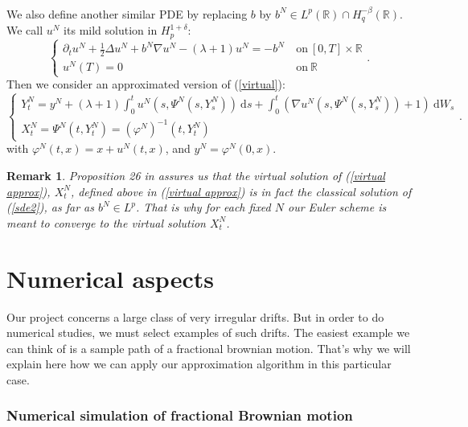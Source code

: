 \documentclass[11pt]{enstaPRE}
\newtheorem{rem}{Remark}
\newcommand{\R}{\mathbb{R}}
\newcommand{\di}{\mathrm{d}}
\begin{document}
\paragraph{}
We also define another similar PDE by replacing $b$ by $b^N\in L^p(\R)\cap H^{-\beta}_q(\R)$. We call $u^N$ its mild solution in $H_p^{1+\delta}$:
\begin{equation}\label{pde2}
\begin{cases}
\partial_t u^N + \frac{1}{2}\Delta u^N + b^N\nabla u^N - (\lambda+1)u^N = -b^N\ &\mathrm{on}\ [0,T]\times\R\\
u^N(T) = 0\ &\mathrm{on}\ \R
\end{cases}.
\end{equation}
Then we consider an approximated version of (\ref{virtual}): \begin{equation}\label{virtual approx}
\begin{cases}
Y_t^N = y^N + (\lambda+1)\int_0^t u^N\left(s,\Psi^N\left(s,Y_s^N\right)\right)\ \di s +\int_0^t \left(\nabla u^N\left(s,\Psi^N\left(s,Y_s^N\right)\right)+1\right)\ \di W_s\\
X_t^N = \Psi^N(t,Y_t^N) = {(\varphi^N)}^{-1}(t,Y_t^N)
\end{cases}.
\end{equation}
with $\varphi^N(t,x) = x + u^N(t,x)$, and $y^N=\varphi^N(0,x)$.

\begin{rem}
    Proposition 26 in \cite{Fla-Iss-Rus-2017} assures us that the virtual solution of (\ref{virtual approx}), $X^N_t$, defined above in (\ref{virtual approx}) is in fact the classical solution of (\ref{sde2}), as far as $b^N\in L^p$. That is why for each fixed $N$ our Euler scheme is meant to converge to the virtual solution $X^N_t$.
\end{rem}

\part{Numerical aspects}

Our project concerns a large class of very irregular drifts. But in order to do numerical studies, we must select examples of such drifts. The easiest example we can think of is a sample path of a fractional brownian motion. That's why we will explain here how we can apply our approximation algorithm in this particular case.

\section{Numerical simulation of fractional Brownian motion}    
\end{document}
